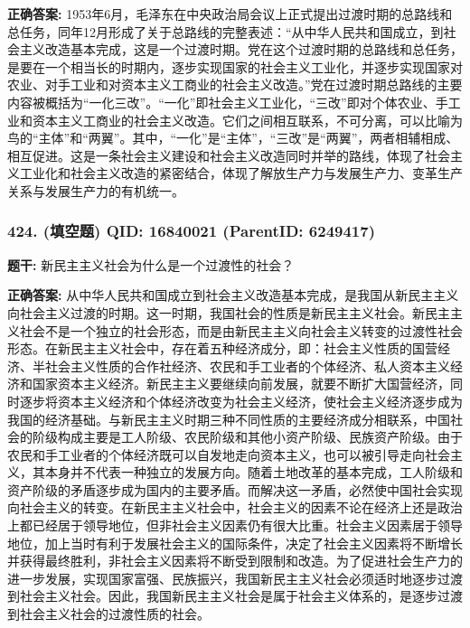 \documentclass[12pt,UTF8]{ctexart}
\begin{document}
\textbf{正确答案:}
1953年6月，毛泽东在中央政治局会议上正式提出过渡时期的总路线和总任务，同年12月形成了关于总路线的完整表述：“从中华人民共和国成立，到社会主义改造基本完成，这是一个过渡时期。党在这个过渡时期的总路线和总任务，是要在一个相当长的时期内，逐步实现国家的社会主义工业化，并逐步实现国家对农业、对手工业和对资本主义工商业的社会主义改造。”党在过渡时期总路线的主要内容被概括为“一化三改”。“一化”即社会主义工业化，“三改”即对个体农业、手工业和资本主义工商业的社会主义改造。它们之间相互联系，不可分离，可以比喻为鸟的“主体”和“两翼”。其中，“一化”是“主体”，“三改”是“两翼”，两者相辅相成、相互促进。这是一条社会主义建设和社会主义改造同时并举的路线，体现了社会主义工业化和社会主义改造的紧密结合，体现了解放生产力与发展生产力、变革生产关系与发展生产力的有机统一。

\vspace{0.3em}\hrulefill\vspace{0.7em}

\subsubsection*{424. (填空题) \small QID: 16840021 (ParentID: 6249417)}

\textbf{题干:}
新民主主义社会为什么是一个过渡性的社会？



\textbf{正确答案:}
从中华人民共和国成立到社会主义改造基本完成，是我国从新民主主义向社会主义过渡的时期。这一时期，我国社会的性质是新民主主义社会。新民主主义社会不是一个独立的社会形态，而是由新民主主义向社会主义转变的过渡性社会形态。在新民主主义社会中，存在着五种经济成分，即：社会主义性质的国营经济、半社会主义性质的合作社经济、农民和手工业者的个体经济、私人资本主义经济和国家资本主义经济。新民主主义要继续向前发展，就要不断扩大国营经济，同时逐步将资本主义经济和个体经济改变为社会主义经济，使社会主义经济逐步成为我国的经济基础。与新民主主义时期三种不同性质的主要经济成分相联系，中国社会的阶级构成主要是工人阶级、农民阶级和其他小资产阶级、民族资产阶级。由于农民和手工业者的个体经济既可以自发地走向资本主义，也可以被引导走向社会主义，其本身并不代表一种独立的发展方向。随着土地改革的基本完成，工人阶级和资产阶级的矛盾逐步成为国内的主要矛盾。而解决这一矛盾，必然使中国社会实现向社会主义的转变。在新民主主义社会中，社会主义的因素不论在经济上还是政治上都已经居于领导地位，但非社会主义因素仍有很大比重。社会主义因素居于领导地位，加上当时有利于发展社会主义的国际条件，决定了社会主义因素将不断增长并获得最终胜利，非社会主义因素将不断受到限制和改造。为了促进社会生产力的进一步发展，实现国家富强、民族振兴，我国新民主主义社会必须适时地逐步过渡到社会主义社会。因此，我国新民主主义社会是属于社会主义体系的，是逐步过渡到社会主义社会的过渡性质的社会。
\end{document}
